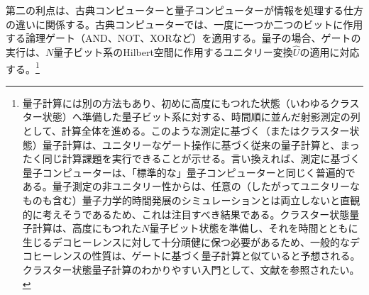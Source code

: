 第二の利点は、古典コンピューターと量子コンピューターが情報を処理する仕方の違いに関係する。古典コンピューターでは、一度に一つか二つのビットに作用する論理ゲート（AND、NOT、XORなど）を適用する。量子の場合、ゲートの実行は、$N$量子ビット系のHilbert空間に作用するユニタリー変換$\hat U$の適用に対応する。\footnote{量子計算には別の方法もあり、初めに高度にもつれた状態（いわゆるクラスター状態）へ準備した量子ビット系に対する、時間順に並んだ射影測定の列として、計算全体を進める\cite{ref326,ref327,ref328}。このような測定に基づく（またはクラスター状態）量子計算は、ユニタリーなゲート操作に基づく従来の量子計算と、まったく同じ計算課題を実行できることが示せる。言い換えれば、測定に基づく量子コンピューターは、「標準的な」量子コンピューターと同じく普遍的である。量子測定の非ユニタリー性からは、任意の（したがってユニタリーなものも含む）量子力学的時間発展のシミュレーションとは両立しないと直観的に考えそうであるため、これは注目すべき結果である。クラスター状態量子計算は、高度にもつれた$N$量子ビット状態を準備し、それを時間とともに生じるデコヒーレンスに対して十分頑健に保つ必要があるため、一般的なデコヒーレンスの性質は、ゲートに基づく量子計算と似ていると予想される。クラスター状態量子計算のわかりやすい入門として、文献\cite{ref329}を参照されたい。}

